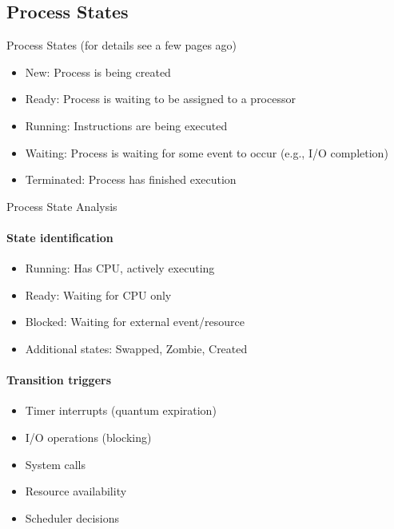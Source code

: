 \subsection{Process States}

\begin{concept}{Process States} (for details see a few pages ago)
    \begin{itemize}
        \item New: Process is being created
        \item Ready: Process is waiting to be assigned to a processor
        \item Running: Instructions are being executed
        \item Waiting: Process is waiting for some event to occur (e.g., I/O completion)
        \item Terminated: Process has finished execution
    \end{itemize}
\end{concept}

\begin{KR}{Process State Analysis}
    \paragraph{State identification}
    \begin{itemize}
        \item Running: Has CPU, actively executing
        \item Ready: Waiting for CPU only
        \item Blocked: Waiting for external event/resource
        \item Additional states: Swapped, Zombie, Created
    \end{itemize}
    
    \paragraph{Transition triggers}
    \begin{itemize}
        \item Timer interrupts (quantum expiration)
        \item I/O operations (blocking)
        \item System calls
        \item Resource availability
        \item Scheduler decisions
    \end{itemize}
\end{KR}

